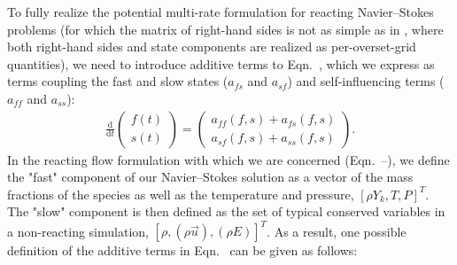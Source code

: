 To fully realize the potential multi-rate formulation for reacting
Navier--Stokes problems (for which the matrix of right-hand sides is
not as simple as in \cite{mikida2019multi}, where both right-hand sides
and state components are realized as per-overset-grid quantities),
we need to introduce additive terms to Eqn.~, which we express
as terms coupling the fast and slow states ($a_{fs}$ and $a_{sf}$) and
self-influencing terms ($a_{ff}$ and $a_{ss}$):
\begin{align}
\frac{\textrm{d}}{\textrm{d}t}\left( \begin{array}{c} f(t) \\ s(t) \end{array} \right) = \left( \begin{array}{c} a_{ff}(f,s) + a_{fs}(f,s) \\ a_{sf}(f,s) + a_{ss}(f,s) \end{array} \right). \label{eq:mr_reacting}
\end{align}
In the reacting flow formulation with which we are concerned (Eqn.~--), we define
the "fast" component of our Navier--Stokes solution as a vector of the
mass fractions of the species as well as the temperature and pressure, $[\rho Y_{k}, T, P]^T$.
The "slow" component is then defined as the set of typical conserved variables in a
non-reacting simulation, $[\rho, (\rho \vec{u}), (\rho E)]^T$. As
a result, one possible definition of the additive terms in Eqn.~ can be given as follows:
